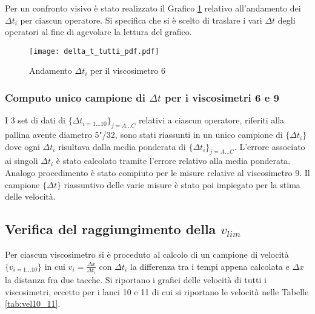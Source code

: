 \documentclass[a4paper,11pt,oneside]{article}
\begin{document}
Per un confronto visivo è stato realizzato il Grafico \ref{fig:andamento_delta_t} relativo all'andamento dei $\Delta t_{i}$ per ciascun operatore. Si specifica che si è scelto di traslare i vari $\Delta t$ degli operatori al fine di agevolare la lettura del grafico.

\begin{figure}[h!]
    \centering
    \texttt{[image: delta\_t\_tutti\_pdf.pdf]}
    \caption{Andamento $\Delta t_{i}$ per il viscosimetro 6}
    \label{fig:andamento_delta_t}
\end{figure}

\subsubsection*{Computo unico campione di  $\Delta t$ per i viscosimetri 6 e 9}
I 3 set di dati di $\{\Delta t_{i=1\dots10}\}_{j=A \dots C}$ relativi a ciascun operatore, riferiti alla pallina avente diametro 5"/32, sono stati riassunti in un unico campione di $\{\Delta t_{i}\}$ dove ogni $\Delta t_{i}$ risultava dalla media ponderata di $\{\Delta t_{i}\}_{j=A \dots C}$. L'errore associato ai singoli ${\Delta t_{i}}$ è stato calcolato tramite l'errore relativo alla media ponderata.\newline
Analogo procedimento è stato compiuto per le misure relative al viscosimetro 9.
Il campione $\{\Delta t\}$ riassuntivo delle varie misure è stato poi impiegato per la stima delle velocità.


\subsection{Verifica del raggiungimento della $v_{lim}$}

Per ciascun viscosimetro si è proceduto al calcolo di un campione di velocità $\{v_{i=1\dots 10}\}$ in cui $v_{i} = \frac{\Delta x}{\Delta t_i}$ con $\Delta t_i$ la differenza tra i tempi appena calcolata e $\Delta x$ la distanza fra due tacche. Si riportano i grafici delle velocità di tutti i viscosimetri, eccetto per i lanci 10 e 11 di cui si riportano le velocità nelle Tabelle \ref{tab:vel10_11}.
\end{document}
